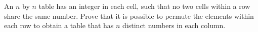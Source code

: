 An $n$ by $n$ table has an integer in each cell, such that no two cells within a row share the same number. Prove that it is possible to permute the elements within each row to obtain a table that has $n$ distinct numbers in each column.